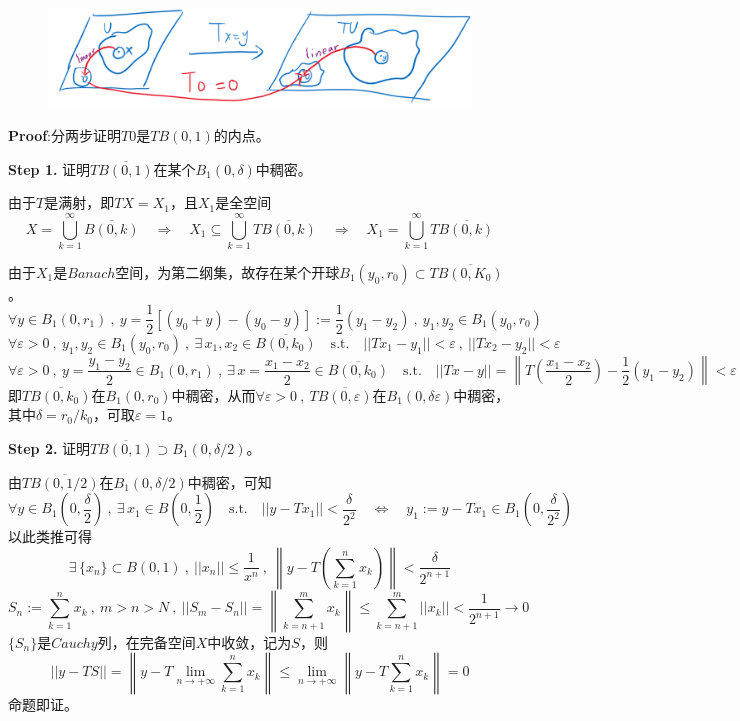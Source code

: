 \begin{figure}[H]
    \center
    \includegraphics[scale=0.3]{./fig/4.4-1.png}
\end{figure}

\textbf{Proof}:分两步证明$T0$是$TB(0,1)$的内点。

\textbf{Step 1. }证明$T\overline{B(0,1)}$在某个$B_1(0,\delta)$中稠密。

由于$T$是满射，即$TX=X_1$，且$X_1$是全空间
\[X=\bigcup_{k=1}^{\infty}\overline{B(0,k)} \quad \Rightarrow \quad X_1 \subseteq \bigcup_{k=1}^{\infty}T\overline{B(0,k)} \quad \Rightarrow \quad X_1=\bigcup_{k=1}^{\infty}T\overline{B(0,k)}\]

由于$X_1$是$Banach$空间，为第二纲集，故存在某个开球$B_1(y_0,r_0) \subset T\overline{B(0,K_0)}$。
\[\forall y \in B_1(0,r_1) \ , \ y=\frac{1}{2}[(y_0+y)-(y_0-y)]:=\frac{1}{2}(y_1-y_2) \ , \ y_1,y_2 \in B_1(y_0,r_0)\]
\[\forall \varepsilon>0 \ , \ y_1,y_2 \in B_1(y_0,r_0) \ , \ \exists \, x_1,x_2 \in \overline{B(0,k_0)} \quad \text{s.t.} \quad ||Tx_1-y_1||<\varepsilon \ , \ ||Tx_2-y_2||<\varepsilon\]
\[\forall \varepsilon>0 \ , \ y=\frac{y_1-y_2}{2} \in B_1(0,r_1) \ , \ \exists \, x=\frac{x_1-x_2}{2} \in \overline{B(0,k_0)} \quad \text{s.t.} \quad ||Tx-y||=\left\|T\left(\frac{x_1-x_2}{2}\right)-\frac{1}{2}(y_1-y_2)\right\|<\varepsilon\]
即$T\overline{B(0,k_0)}$在$B_1(0,r_0)$中稠密，从而$\forall \varepsilon>0 \ , \ T\overline{B(0,\varepsilon)}$在$B_1(0,\delta\varepsilon)$中稠密，其中$\delta=r_0/k_0$，可取$\varepsilon=1$。

\textbf{Step 2. }证明$T\overline{B(0,1)} \supset B_1(0,\delta/2)$。

由$T\overline{B(0,1/2)}$在$B_1(0,\delta/2)$中稠密，可知
\[\forall y \in B_1(0,\frac{\delta}{2}) \ , \ \exists \, x_1 \in B(0,\frac{1}{2}) \quad \text{s.t.} \quad ||y-Tx_1||<\frac{\delta}{2^2} \quad \Leftrightarrow \quad y_1:=y-Tx_1 \in B_1(0,\frac{\delta}{2^2})\]
以此类推可得
\[\exists \, \{x_n\} \subset B(0,1) \ , \ ||x_n|| \leq \frac{1}{x^n} \ , \ \left\|y-T\left(\sum_{k=1}^nx_k\right)\right\|<\frac{\delta}{2^{n+1}}\]
\[S_n:=\sum_{k=1}^nx_k \ , \ m>n>N \ , \ ||S_m-S_n||=\left\|\sum_{k=n+1}^mx_k\right\| \leq \sum_{k=n+1}^m||x_k||<\frac{1}{2^{n+1}} \to 0\]
$\{S_n\}$是$Cauchy$列，在完备空间$X$中收敛，记为$S$，则
\[||y-TS||=\left\|y-T\lim_{n \to +\infty}\sum_{k=1}^nx_k\right\| \leq \lim_{n \to +\infty}\left\|y-T\sum_{k=1}^nx_k\right\|=0\]
命题即证。

